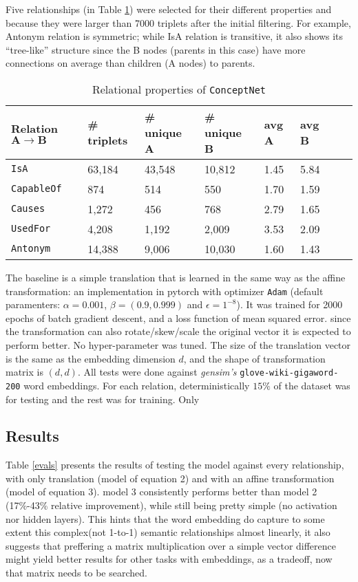 Five relationships (in Table \ref{relprops}) were selected for their different properties and because they were
larger than 7000 triplets after the initial filtering. For example, Antonym relation
is symmetric; while IsA relation is transitive, it also shows its ``tree-like'' structure since
the B nodes (parents in this case) have more connections on average than children (A nodes) to
parents.

\begin{table}
    \center
	\caption{Relational properties of \texttt{ConceptNet}}
    \label{relprops}
	\begin{tabular}{|l|l|l|l|l|l|l|l|}
		\hline
		Relation $\bm{A} \to \bm{B}$ & # triplets & # unique A & # unique B  & avg A & avg B \\
		\hline
        \texttt{IsA} & 63,184 & 43,548 & 10,812 & 1.45& 5.84\\
		\hline
        \texttt{CapableOf} & 874 & 514 & 550 & 1.70 & 1.59 \\
		\hline
        \texttt{Causes} & 1,272 & 456 & 768 & 2.79 & 1.65 \\
		\hline
        \texttt{UsedFor} & 4,208 & 1,192 & 2,009 & 3.53 & 2.09 \\
		\hline
        \texttt{Antonym} & 14,388 & 9,006 & 10,030 & 1.60 & 1.43 \\
		\hline
	\end{tabular}
\end{table}

The baseline is a simple translation that is learned in the same way as the affine transformation:
an implementation in pytorch with optimizer \texttt{Adam} (default paramenters:
$\alpha= 0.001$, $\beta =(0.9, 0.999)$ and $\epsilon = 1^{-8}$). It was trained for 2000 epochs of batch gradient
descent, and a loss function of mean squared error.
since the transformation can also rotate/skew/scale the original vector it is expected to perform better.
No hyper-parameter was tuned. The size of the translation vector is the same as the embedding dimension $d$,
and the shape of transformation matrix is $(d,d)$.
All tests were done against \emph{gensim's} \texttt{glove-wiki-gigaword-200} word embeddings.
For each relation, deterministically $15\%$ of the dataset was for testing and the rest was for training.
Only

\subsection{Results}

Table \ref{evals} presents the results of testing the model against every relationship,
with only translation (model of equation 2) and with an affine transformation (model of equation 3).
model 3 consistently performs better than model 2 (17\%-43\% relative improvement),
while still being pretty simple (no activation nor hidden layers).
This hints that the word embedding do capture to some extent this complex(not 1-to-1)
semantic relationships almost linearly, it also suggests that preffering a matrix multiplication
over a simple vector difference might yield better results for other tasks with embeddings,
as a tradeoff, now that matrix needs to be searched.

